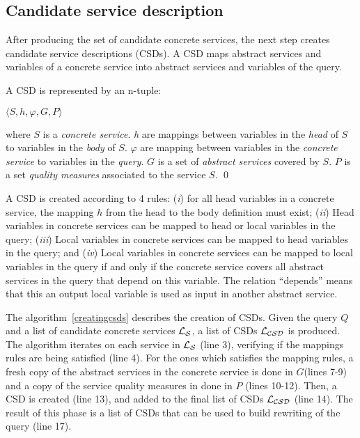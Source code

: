 
\subsection{Candidate service description}

After producing the set of candidate concrete services, the next step 
creates candidate service descriptions (CSDs). 
A CSD maps abstract services and variables of a concrete service into abstract 
services and variables of the query. 

\begin{definition}
A CSD is represented by an n-tuple:
\begin{center}
$\langle S, h, \varphi, G, P\rangle$
\end{center}
where $S$ is a \textit{concrete service}. 
\textit{h} are mappings between variables in the \textit{head} of $S$ to variables in the \textit{body} of $S$. 
$\varphi$ are mapping between variables in the \textit{concrete service} to variables in the \textit{query}.
$G$ is a set of \textit{abstract services} covered by $S$. 
$P$ is a set \textit{quality measures} associated to the service $S$. 
\qed
\end{definition} 
 
A CSD is created according to 4 rules: (\textit{i}) for all head variables in a
concrete service, the mapping $h$ from the head to the body definition must
exist; (\textit{ii}) Head variables in concrete services can be mapped to head
or local variables in the query; (\textit{iii}) Local variables in concrete
services can be mapped to head variables in the query; and (\textit{iv}) Local
variables in concrete services can be mapped to local variables in the query if and only if the concrete service covers all abstract services in the query that depend on this variable. The relation ``depends''  means that this an output local variable is used as input in another abstract service.

The algorithm~\ref{creatingcsds} describes the creation of CSDs. Given the query $Q$ and a list of candidate concrete services $\hbox{${\cal L_{S}}$}$, a list of CSDs $\hbox{${\cal L_{CSD}}$}$ is produced. 
The algorithm iterates on each service in $\hbox{${\cal L_{S}}$}$ (line 3), verifying if the mappings rules are being satisfied (line 4). For the ones which satisfies the mapping rules, a fresh copy of the abstract services in the concrete service is done in $G$(lines 7-9) and a copy of the service quality measures in done in $P$ (lines 10-12). Then,
a CSD is created (line 13), and added to the final list of CSDs $\hbox{${\cal L_{CSD}}$}$ (line 14).
The result of this phase is a list of CSDs that can be used to build rewriting of the query (line 17).


